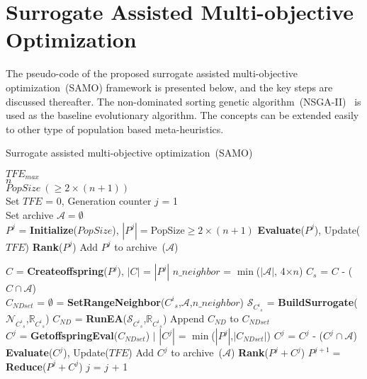 \section{Surrogate Assisted Multi-objective Optimization}
\label{sec:algo}

The pseudo-code of the proposed surrogate assisted multi-objective optimization~(SAMO) framework is presented below, and the key steps are discussed thereafter. The non-dominated sorting genetic algorithm~(NSGA-II)~\cite{deb2002fae} is used as the baseline evolutionary algorithm. The concepts can be extended easily to other type of population based meta-heuristics.

\begin{algorithm}[!htb]\scriptsize
	\caption{Surrogate assisted multi-objective optimization~(SAMO)}
	\begin{algorithmic}[1]
		\REQUIRE $TFE_{max}$\quad {}\\
		\REQUIRE $n$\quad {}\\
		\REQUIRE $PopSize~(\ge 2\times(n+1))$\quad {}\\
		\STATE Set $TFE$ = 0, Generation counter $j$ = 1\\
		\STATE Set archive $\mathcal{A} = \emptyset$ \quad {}\\
		\STATE $P^j$ = \textbf{Initialize}($PopSize$), $\left|P^j\right| = $PopSize$ \ge 2\times(n+1)$ 
		\STATE \textbf{Evaluate}($P^j$), Update($TFE$)
		\STATE \textbf{Rank}($P^j$)
		\STATE Add $P^j$ to archive~($\mathcal{A}$) 
		
		\STATE $C$ = \textbf{Createoffspring}($P^j$), $\left|C\right|$ = $\left|P^j\right|$
		\STATE $n\_neighbor$ = $\min$($\left|\mathcal{A}\right|$, 4$\times n$)
		\STATE $C_s$ = $C$ - ($C \cap \mathcal{A}$) \quad {}\\
		\STATE $C_{NDset}$ = $\emptyset$
		 = \textbf{SetRangeNeighbor}(${C^{i}}_s$,$\mathcal{A}$,$n\_neighbor$) 
		\STATE $\mathcal{S}_{{C^{i}}_s}$ = \textbf{BuildSurrogate}($\mathcal{N}_{{C^{i}}_s}$,$\mathbb{R}_{{C^{i}}_s}$)
		\STATE $C_{ND}$ = \textbf{RunEA}($\mathcal{S}_{{C^{i}}_s}$,$\mathbb{R}_{{C^{i}}_s}$)
		\STATE Append $C_{ND}$ to $C_{NDset}$ \quad {}\\
		\ENDFOR
		\STATE $C^j$ = \textbf{GetoffspringEval}($C_{NDset}$) $|$ $\left|C^j\right|$ = $\min$($\left|P^j\right|$,$\left|C_{NDset}\right|$)
		\STATE $C^j$ = $C^j$ - ($C^j \cap \mathcal{A}$)\quad {}\\
		\STATE \textbf{Evaluate}($C^j$), Update($TFE$)
		\STATE Add $C^j$ to archive~($\mathcal{A}$)
		\STATE \textbf{Rank}($P^j + C^j$)
		\STATE $P^{j+1} = $\textbf{Reduce}($P^j + C^j$)
		\STATE $j$ = $j$ + 1
		\ENDWHILE			
		

\end{algorithmic}
\end{algorithm}
